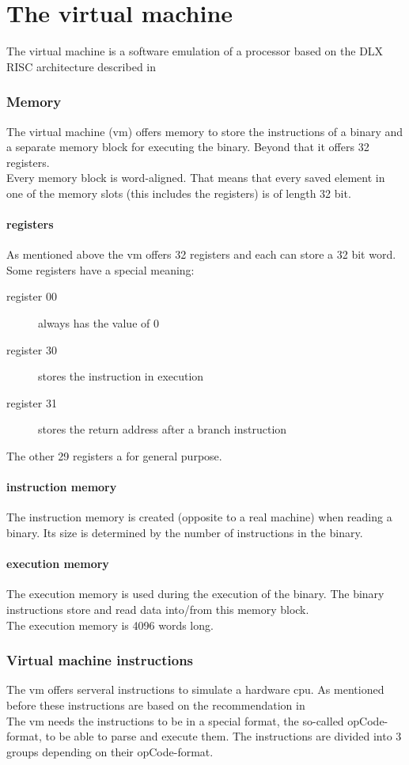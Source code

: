 \part{The virtual machine}
The virtual machine is a software emulation of a processor based on the DLX RISC
architecture described in %
\section{Memory}
The virtual machine (vm) offers memory to store the instructions of a binary and
a separate memory block for executing the binary. Beyond that it offers 32
registers. \\
Every memory block is word-aligned. That means that every saved element in one
of the memory slots (this includes the registers) is of length 32 bit.
\subsection{registers}
As mentioned above the vm offers 32 registers and each can store a 32 bit word.
Some registers have a special meaning: 
\begin{description}
  \item [register 00] always has the value of 0
  \item [register 30] stores the instruction in execution
  \item [register 31] stores the return address after a branch instruction
\end{description}
The other 29 registers a for general purpose.
\subsection{instruction memory}
The instruction memory is created (opposite to a real machine) when reading a
binary. Its size is determined by the number of instructions in the binary. 
\subsection{execution memory}
The execution memory is used during the execution of the binary. The binary
instructions store and read data into/from this memory block. \\
The execution memory is 4096 words long. 
\section{Virtual machine instructions}
The vm offers serveral instructions to simulate a hardware cpu. As mentioned
before these instructions are based on the recommendation in %
\\
The vm needs the instructions to be in a special format, the so-called
opCode-format, to be able to parse and execute them. The instructions are
divided into 3 groups depending on their opCode-format.
\\
